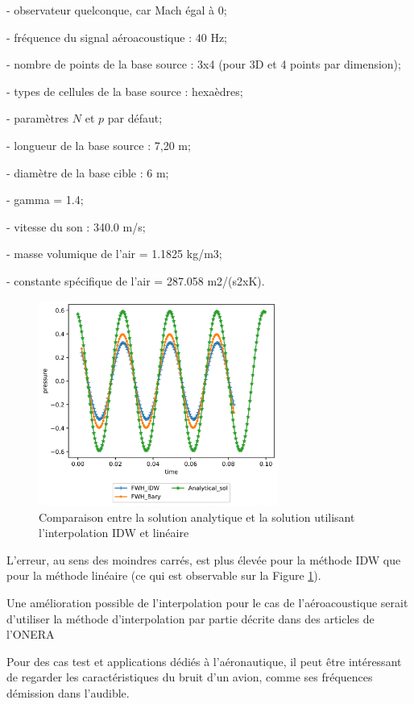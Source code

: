 - observateur quelconque, car Mach égal à 0;

- fréquence du signal aéroacoustique : 40 Hz;

- nombre de points de la base source : 3x4 (pour 3D et 4 points par dimension);

- types de cellules de la base source : hexaèdres;

- paramètres \(N\) et \(p\) par défaut;

- longueur de la base source : 7,20 m;

- diamètre de la base cible : 6 m;

- gamma = 1.4;

- vitesse du son : 340.0 m/s;

- masse volumique de l'air = 1.1825 kg/m3;

- constante spécifique de l'air = 287.058 m2/(s2xK).

\begin{figure}[H]
    \centering
    \includegraphics[width=0.70\textwidth]{images/onde_aac.png}
    \caption{Comparaison entre la solution analytique et la solution utilisant l'interpolation IDW et linéaire}
    \label{fig:onde_aac}
\end{figure}

L'erreur, au sens des moindres carrés, est plus élevée pour la méthode IDW que pour la méthode linéaire (ce qui est observable sur la Figure \ref{fig:onde_aac}).


Une amélioration possible de l'interpolation pour le cas de l'aéroacoustique serait d'utiliser la méthode d'interpolation par partie décrite dans des articles de l’ONERA \cite{cunha2011} \cite{cunha2016}

Pour des cas test et applications dédiés à l'aéronautique, il peut être intéressant de regarder les caractéristiques du bruit d'un avion, comme ses fréquences démission dans l'audible. \cite{frequence}

